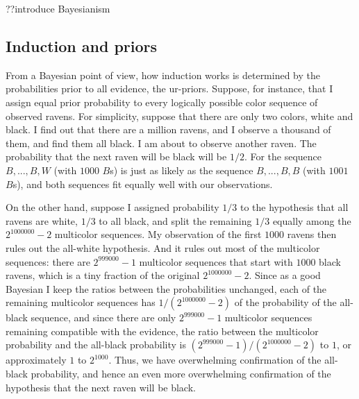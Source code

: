 ??introduce Bayesianism

\subsection{Induction and priors}
From a Bayesian point of view, how induction works is determined by the probabilities prior to all evidence, the ur-priors.
Suppose, for instance, that I assign equal prior probability to every logically possible color sequence of observed ravens. 
For simplicity, suppose that there are only two colors, white and black.  I find out that there are a million ravens, and 
I observe a thousand of them, and find them all black. I am about to observe another raven. The probability that the next 
raven will be black will be $1/2$. For the sequence $B,...,B,W$ (with $1000$ $B$s) is just as likely as the sequence
$B,...,B,B$ (with $1001$ $B$s), and both sequences fit equally well with our observations. 

On the other hand, suppose I assigned probability $1/3$ to the hypothesis that all ravens are white, $1/3$ to all black,
and split the remaining $1/3$ equally among the $2^{1000000}-2$ multicolor sequences. My observation of the first $1000$
ravens then rules out the all-white  hypothesis. And it rules out most of the multicolor sequences: there are $2^{999000}-1$
multicolor sequences that start with $1000$ black ravens, which is a tiny fraction of the original $2^{1000000}-2$. Since as a 
good Bayesian I keep the ratios between the probabilities unchanged, each of the remaining multicolor sequences has 
$1/(2^{1000000}-2)$ of the probability of the all-black sequence, and since there are only $2^{999000}-1$ multicolor
sequences remaining compatible with the evidence, the ratio between the multicolor probability and the all-black probability
is $(2^{999000}-1)/(2^{1000000}-2)$ to $1$, or approximately $1$ to $2^{1000}$. Thus, we have overwhelming confirmation of 
the all-black probability, and hence an even more overwhelming confirmation of the hypothesis that the next raven will be black.

